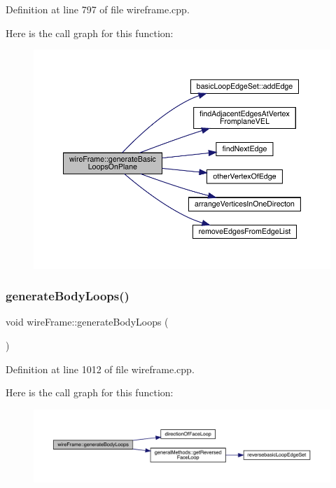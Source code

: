 Definition at line 797 of file wireframe.\+cpp.

Here is the call graph for this function\+:
\nopagebreak
\begin{figure}[H]
\begin{center}
\leavevmode
\includegraphics[width=350pt]{classwire_frame_ad570a0e37cc761e789d101904c64ef1a_cgraph}
\end{center}
\end{figure}
\mbox{\label{classwire_frame_a114f0cea254a8845bf5e999503dfcdec}} 
\subsubsection{\texorpdfstring{generate\+Body\+Loops()}{generateBodyLoops()}}
{\footnotesize\ttfamily void wire\+Frame\+::generate\+Body\+Loops (\begin{DoxyParamCaption}{ }\end{DoxyParamCaption})}



Definition at line 1012 of file wireframe.\+cpp.

Here is the call graph for this function\+:
\nopagebreak
\begin{figure}[H]
\begin{center}
\leavevmode
\includegraphics[width=350pt]{classwire_frame_a114f0cea254a8845bf5e999503dfcdec_cgraph}
\end{center}
\end{figure}
\mbox{\label{classwire_frame_ac5c8d8c3b1b5f693ad46cb54aae1108a}} 
